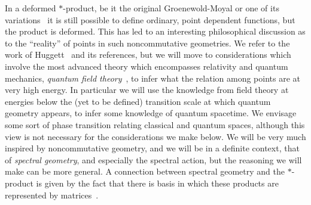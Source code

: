 \documentclass[12pt,a4paper]{article}
\begin{document}
In a deformed $*$-product, be it the original Groenewold-Moyal or one of its variations~\cite{GalluccioLizziVitale1, GalluccioLizziVitale2,TanasaVitale} it is still possible to define ordinary, point dependent functions, but the product is deformed. This has led to an interesting philosophical discussion as to the ``reality'' of points in such noncommutative geometries. We refer to the work of Huggett~\cite{Huggett} and its references, but we will move to considerations which involve the most advanced theory which encompasses relativity and quantum mechanics, \emph{quantum field theory}~\cite{Weinberg}, to infer what the relation among points are at very high energy. In particular we will use the knowledge from field theory at energies below the (yet to be defined) transition scale at which quantum geometry appears, to infer some knowledge of quantum spacetime. We  envisage some sort of phase transition relating classical and quantum spaces, although this view is not necessary for the considerations we make below.
We will be very much inspired by noncommutative geometry, and we will be in a definite context, that of \emph{spectral geometry}, and especially the spectral action, but the reasoning we will make can be more general. A connection between spectral geometry and the $*$-product  is given by the fact that there is basis in which these products are represented by matrices~\cite{LizziVitaleReview}.
\end{document}
